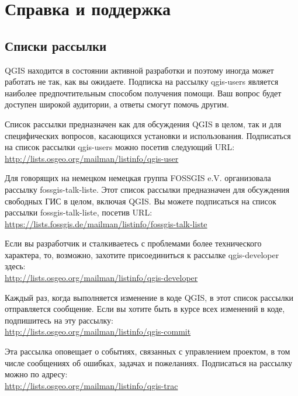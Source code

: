 
\chapter{Справка и поддержка}\label{label_helpsupport}


\section{Списки рассылки}
QGIS находится в состоянии активной разработки и поэтому иногда может
работать не так, как вы ожидаете. Подписка на рассылку qgis-users
является наиболее предпочтительным способом получения помощи. Ваш вопрос
будет доступен широкой аудитории, а ответы смогут помочь другим.

Список рассылки предназначен как для обсуждения QGIS в целом, так и для
специфических вопросов, касающихся установки и использования.
Подписаться на список рассылки qgis-users можно посетив следующий URL: \\
\url{http://lists.osgeo.org/mailman/listinfo/qgis-user}

Для говорящих на немецком немецкая группа FOSSGIS e.V. организовала
рассылку fossgis-talk-liste. Этот список рассылки предназначен для
обсуждения свободных ГИС в целом, включая QGIS. Вы можете подписаться на
список рассылки fossgis-talk-liste, посетив URL: \\
\url{https://lists.fossgis.de/mailman/listinfo/fossgis-talk-liste}

Если вы разработчик и сталкиваетесь с проблемами более технического
характера, то, возможно, захотите присоединиться к рассылке
qgis-developer здесь:\\
\url{http://lists.osgeo.org/mailman/listinfo/qgis-developer}

Каждый раз, когда выполняется изменение в коде QGIS, в этот список
рассылки отправляется сообщение. Если вы хотите быть в курсе всех
изменений в коде, подпишитесь на эту рассылку:\\
\url{http://lists.osgeo.org/mailman/listinfo/qgis-commit}

Эта рассылка оповещает о событиях, связанных с управлением проектом, в
том числе сообщениях об ошибках, задачах и пожеланиях. Подписаться на
рассылку можно по адресу:\\
\url{http://lists.osgeo.org/mailman/listinfo/qgis-trac}

